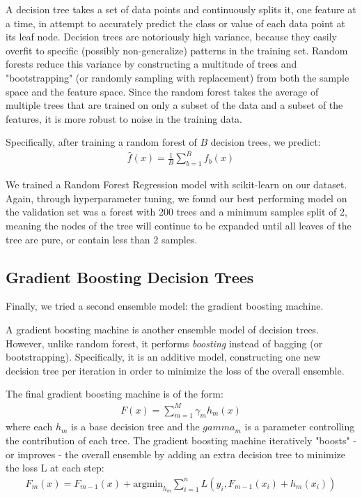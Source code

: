 \documentclass[journal]{IEEEtran}
\begin{document}
A decision tree takes a set of data points and continuously splits it, one feature at a time, in attempt to accurately predict the class or value of each data point at its leaf node. Decision trees are notoriously high variance, because they easily overfit to specific (possibly non-generalize) patterns in the training set. Random forests reduce this variance by constructing a multitude of trees and "bootstrapping" (or randomly sampling with replacement) from both the sample space and the feature space. Since the random forest takes the average of multiple trees that are trained on only a subset of the data and a subset of the features, it is more robust to noise in the training data.

Specifically, after training a random forest of $B$ decision trees, we predict: \begin{align*}
    \hat{f}(x) = \frac{1}{B}\sum_{b=1}^{B} f_b(x)
\end{align*}

We trained a Random Forest Regression model with scikit-learn on our dataset. Again, through hyperparameter tuning, we found our best performing model on the validation set was a forest with 200 trees and a minimum samples split of 2, meaning the nodes of the tree will continue to be expanded until all leaves of the tree are pure, or contain less than 2 samples.

\subsection{Gradient Boosting Decision Trees}
Finally, we tried a second ensemble model: the gradient boosting machine.

A gradient boosting machine is another ensemble model of decision trees. However, unlike random forest, it performs \textit{boosting} instead of bagging (or bootstrapping). Specifically, it is an additive model, constructing one new decision tree per iteration in order to minimize the loss of the overall ensemble.

The final gradient boosting machine is of the form: \begin{align*}
    F(x) = \sum_{m=1}^{M}\gamma_m h_m(x)
\end{align*}
where each $h_m$ is a base decision tree and the $gamma_m$ is a parameter controlling the contribution of each tree. The gradient boosting machine iteratively "boosts" - or improves - the overall ensemble by adding an extra decision tree to minimize the loss L at each step: \begin{align*}
    F_m(x) = F_{m-1}(x) + \text{argmin}_{h_m} \sum_{i=1}^{n} L(y_i, F_{m-1}(x_i)+h_m(x_i))
\end{align*}
\end{document}
